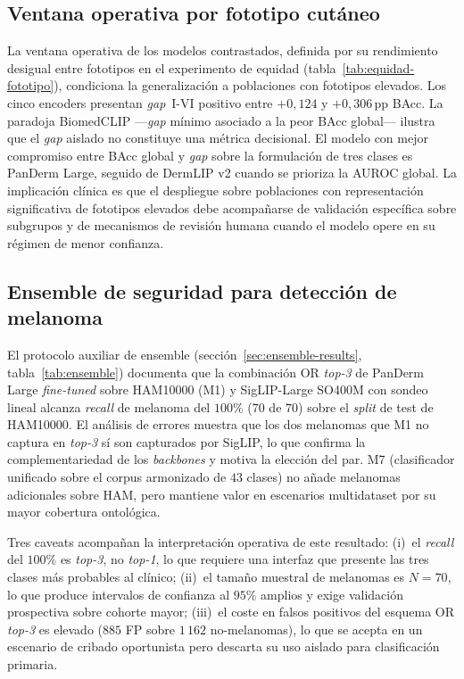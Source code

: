 \subsection{Ventana operativa por fototipo cutáneo}
\label{sec:disc-ventana}

La ventana operativa de los modelos contrastados, definida por su
rendimiento desigual entre fototipos en el experimento de equidad
(tabla~\ref{tab:equidad-fototipo}), condiciona la generalización a
poblaciones con fototipos elevados. Los cinco encoders presentan
\emph{gap}~I-VI positivo entre $+0{,}124$ y $+0{,}306$\,pp BAcc.
La paradoja BiomedCLIP ---\emph{gap} mínimo asociado a la peor
BAcc global---  ilustra que el \emph{gap} aislado no constituye
una métrica decisional. El modelo con mejor compromiso entre BAcc
global y \emph{gap} sobre la formulación de tres clases es PanDerm
Large, seguido de DermLIP v2 cuando se prioriza la AUROC global.
La implicación clínica es que el despliegue sobre poblaciones con
representación significativa de fototipos elevados debe acompañarse
de validación específica sobre subgrupos y de mecanismos de revisión
humana cuando el modelo opere en su régimen de menor confianza.

\subsection{Ensemble de seguridad para detección de melanoma}
\label{sec:disc-ensemble}

El protocolo auxiliar de ensemble (secci\'on~\ref{sec:ensemble-results},
tabla~\ref{tab:ensemble}) documenta que la combinación OR
\emph{top-3} de PanDerm Large \emph{fine-tuned} sobre HAM10000 (M1)
y SigLIP-Large SO400M con sondeo lineal alcanza \emph{recall} de
melanoma del $100\%$ ($70$ de $70$) sobre el \emph{split}
de test de HAM10000. El análisis de errores muestra que los dos
melanomas que M1 no captura en \emph{top-3} sí son capturados por
SigLIP, lo que confirma la complementariedad de los \emph{backbones}
y motiva la elección del par. M7 (clasificador unificado sobre el
corpus armonizado de $43$ clases) no añade melanomas adicionales
sobre HAM, pero mantiene valor en escenarios multidataset por su
mayor cobertura ontológica.

Tres caveats acompañan la interpretación operativa de este
resultado: (i)~el \emph{recall} del $100\%$ es \emph{top-3}, no
\emph{top-1}, lo que requiere una interfaz que presente las tres
clases más probables al clínico; (ii)~el tamaño muestral de
melanomas es $N = 70$, lo que produce intervalos de confianza al
$95\%$ amplios y exige validación prospectiva sobre cohorte
mayor; (iii)~el coste en falsos positivos del esquema OR
\emph{top-3} es elevado ($885$ FP sobre $1\,162$ no-melanomas),
lo que se acepta en un escenario de cribado oportunista pero
descarta su uso aislado para clasificación primaria.

